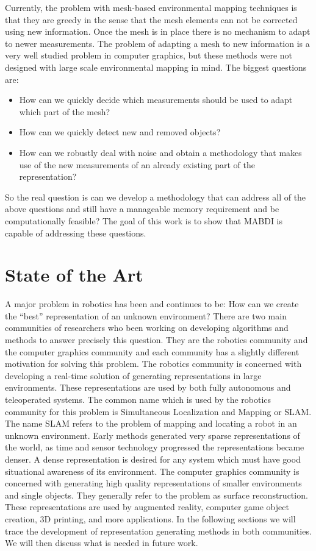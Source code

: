 \documentclass[12pt]{article}
\begin{document}
Currently, the problem with mesh-based environmental mapping techniques is
that they are greedy in the sense that the mesh elements can not be
corrected using new information. Once the mesh is in place there is no
mechanism to adapt to newer measurements. The problem of adapting a mesh to
new information is a very well studied problem in computer graphics, but
these methods were not designed with large scale environmental mapping in
mind. The biggest questions are: 

\begin{itemize}
\item How can we quickly decide which measurements should be used to adapt
which part of the mesh? 
\item How can we quickly detect new and removed objects? 
\item How can we robustly deal with noise and obtain a methodology that makes use of the new
measurements of an already existing part of the representation? 
\end{itemize}

So the real question is can we develop a methodology that can address all
of the above questions and still have a manageable memory requirement and
be computationally feasible? The goal of this work is to show that MABDI is
capable of addressing these questions. 

\section{State of the Art}
\label{ch:stateoftheart}

A major problem in robotics has been and continues to be: How can we create
the ``best'' representation of an unknown environment? There are two main
communities of researchers who been working on developing algorithms
and methods to answer precisely this question. They are the robotics
community and the computer graphics community and each community has a
slightly different motivation for solving this problem. The robotics
community is concerned with developing a real-time solution of generating
representations in large environments. These representations are used by
both fully autonomous and teleoperated systems. The common name which is
used by the robotics community for this problem is Simultaneous
Localization and Mapping or SLAM. The name SLAM refers to the problem of
mapping and locating a robot in an unknown environment. Early methods
generated very sparse representations of the world, as time and sensor
technology progressed the representations became denser. A dense
representation is desired for any system which must have good situational
awareness of its environment. The computer graphics community is concerned
with generating high quality representations of smaller environments and
single objects. They generally refer to the problem as surface
reconstruction. These representations are used by augmented reality,
computer game object creation, 3D printing, and more applications. In the following
sections we will trace the development of representation generating methods
in both communities. We will then discuss what is needed in future work.
\end{document}
